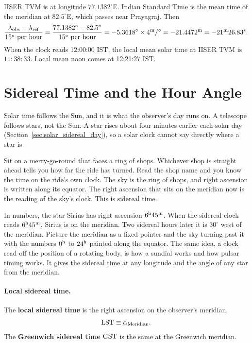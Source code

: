 \begin{example}
	IISER TVM is at longitude $77.1382^\circ$E. Indian Standard Time is the mean time of the meridian at $82.5^\circ$E, which passes near Prayagraj. Then
	\[
	\frac{\lambda_{\rm obs}-\lambda_{\rm ref}}{15^\circ\ \text{per hour}}=\frac{77.1382^\circ-82.5^\circ}{15^\circ\ \text{per hour}}=-5.3618^\circ\times4^{\rm m}/^\circ=-21.4472^{\rm m}=-21^{\rm m}26.83^{\rm s}.
	\]
	When the clock reads 12:00:00 IST, the local mean solar time at IISER TVM is $11{:}38{:}33$. Local mean noon comes at 12:21:27 IST.
\end{example}

\section{Sidereal Time and the Hour Angle}
\label{ti:sec:sidereal_time}

Solar time follows the Sun, and it is what the observer's day runs on. A telescope follows stars, not the Sun. A star rises about four minutes earlier each solar day (Section~\ref{sec:solar_sidereal_day}), so a solar clock cannot say directly where a star is.

Sit on a merry-go-round that faces a ring of shops. Whichever shop is straight ahead tells you how far the ride has turned. Read the shop name and you know the time on the ride's own clock. The sky is the ring of shops, and right ascension is written along its equator. The right ascension that sits on the meridian now is the reading of the sky's clock. This is sidereal time.

In numbers, the star Sirius has right ascension $6^{\rm h}45^{\rm m}$. When the sidereal clock reads $6^{\rm h}45^{\rm m}$, Sirius is on the meridian. Two sidereal hours later it is $30^\circ$ west of the meridian. Picture the meridian as a fixed pointer and the sky turning past it with the numbers $0^{\rm h}$ to $24^{\rm h}$ painted along the equator. The same idea, a clock read off the position of a rotating body, is how a sundial works and how pulsar timing works. It gives the sidereal time at any longitude and the angle of any star from the meridian.

\paragraph{Local sidereal time.} The \textbf{local sidereal time} is the right ascension on the observer's meridian,
\begin{equation}
	\mathrm{LST} \equiv \alpha_{\rm Meridian}.
	\label{eq:lst_def}
\end{equation}
The \textbf{Greenwich sidereal time} $\mathrm{GST}$ is the same at the Greenwich meridian.

